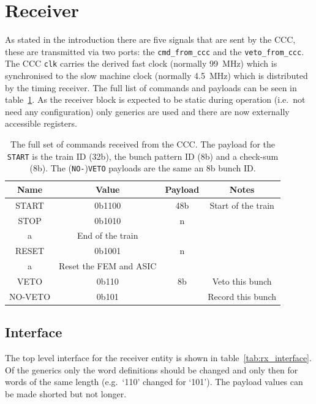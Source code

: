 \section{Receiver} %
\label{sec:receiver}
As stated in the introduction there are five signals that are sent by the CCC, these are transmitted via two ports: the \texttt{cmd\_from\_ccc} and the \texttt{veto\_from\_ccc}. The CCC \texttt{clk} carries the derived fast clock (normally 99~MHz) which is synchronised to the slow machine clock (normally 4.5~MHz) which is distributed by the timing receiver. The full list of commands and payloads can be seen in table~\ref{tab:ccc_commands}. As the receiver block is expected to be static during operation (i.e.\ not need any configuration) only generics are used and there are now externally accessible registers.
\begin{table}
  \begin{center}
  \begin{tabular}{c | c | c | c}
    Name     & Value & Payload & Notes \\
    \hline
    START    & 0b1100 & 48b    & Start of the train \\
    STOP     & 0b1010 & n\\a   & End of the train \\
    RESET    & 0b1001 & n\\a   & Reset the FEM and ASIC \\
    \hline
    VETO     & 0b110  & 8b     & Veto this bunch \\
    NO-VETO  & 0b101  &        & Record this bunch \\
  \end{tabular}
  \end{center}
  \caption{The full set of commands received from the CCC. The payload for the \texttt{START} is the train ID (32b), the bunch pattern ID (8b) and a check-sum (8b). The (\texttt{NO-})\texttt{VETO} payloads are the same an 8b bunch ID.}
  \label{tab:ccc_commands}
\end{table}

\subsection{Interface} %
\label{sub:rx_interface}
The top level interface for the receiver entity is shown in table~\ref{tab:rx_interface}. Of the generics only the word definitions should be changed and only then for words of the same length (e.g.\ `110' changed for `101'). The payload values can be made shorted but not longer.
    
